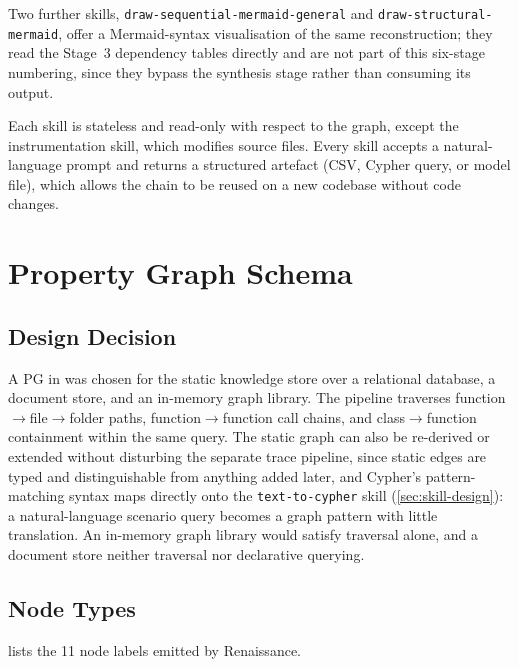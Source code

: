 Two further skills, \texttt{draw-sequential-mermaid-general} and
\texttt{draw-structural-mermaid}, offer a Mermaid-syntax visualisation of
the same reconstruction; they read the Stage~3 dependency tables directly
and are not part of this six-stage numbering, since they bypass the
synthesis stage rather than consuming its output.

Each skill is stateless and read-only with respect to the graph, except
the instrumentation skill, which modifies source files. Every skill
accepts a natural-language prompt and returns a structured artefact (CSV,
Cypher query, or model file), which allows the chain to be reused on a
new codebase without code changes.

\section{Property Graph Schema}\label{sec:pg-schema}

\subsection{Design Decision}\label{sec:pg-decision}

A \ac{PG} in \neo was chosen for the static knowledge store over a
relational database, a document store, and an in-memory graph library.
The pipeline traverses function$\to$file$\to$folder paths,
function$\to$function call chains, and class$\to$function containment
within the same query. The static graph can also be re-derived or extended without disturbing
the separate trace pipeline, since static edges are typed and
distinguishable from anything added later, and Cypher's pattern-matching
syntax maps directly onto the \texttt{text-to-cypher} skill
(\cref{sec:skill-design}): a natural-language scenario query becomes a
graph pattern with little translation. An in-memory graph library would
satisfy traversal alone, and a document store neither traversal nor
declarative querying.

\subsection{Node Types}\label{sec:node-types}

 lists the 11 node labels emitted by Renaissance.

